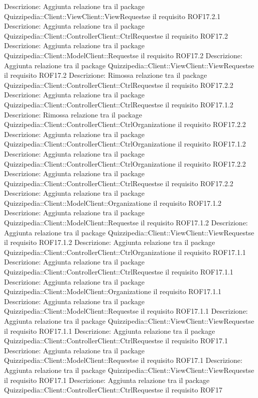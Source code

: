 Descrizione: Aggiunta relazione tra il package Quizzipedia::Client::ViewClient::ViewRequestse il requisito ROF17.2.1 
Descrizione: Aggiunta relazione tra il package Quizzipedia::Client::ControllerClient::CtrlRequestse il requisito ROF17.2 
Descrizione: Aggiunta relazione tra il package Quizzipedia::Client::ModelClient::Requestse il requisito ROF17.2 
Descrizione: Aggiunta relazione tra il package Quizzipedia::Client::ViewClient::ViewRequestse il requisito ROF17.2 
Descrizione: Rimossa relazione tra il package Quizzipedia::Client::ControllerClient::CtrlRequestse il requisito ROF17.2.2 
Descrizione: Aggiunta relazione tra il package Quizzipedia::Client::ControllerClient::CtrlRequestse il requisito ROF17.1.2 
Descrizione: Rimossa relazione tra il package Quizzipedia::Client::ControllerClient::CtrlOrganizatione il requisito ROF17.2.2 
Descrizione: Aggiunta relazione tra il package Quizzipedia::Client::ControllerClient::CtrlOrganizatione il requisito ROF17.1.2 
Descrizione: Aggiunta relazione tra il package Quizzipedia::Client::ControllerClient::CtrlOrganizatione il requisito ROF17.2.2 
Descrizione: Aggiunta relazione tra il package Quizzipedia::Client::ControllerClient::CtrlRequestse il requisito ROF17.2.2 
Descrizione: Aggiunta relazione tra il package Quizzipedia::Client::ModelClient::Organizatione il requisito ROF17.1.2 
Descrizione: Aggiunta relazione tra il package Quizzipedia::Client::ModelClient::Requestse il requisito ROF17.1.2 
Descrizione: Aggiunta relazione tra il package Quizzipedia::Client::ViewClient::ViewRequestse il requisito ROF17.1.2 
Descrizione: Aggiunta relazione tra il package Quizzipedia::Client::ControllerClient::CtrlOrganizatione il requisito ROF17.1.1 
Descrizione: Aggiunta relazione tra il package Quizzipedia::Client::ControllerClient::CtrlRequestse il requisito ROF17.1.1 
Descrizione: Aggiunta relazione tra il package Quizzipedia::Client::ModelClient::Organizatione il requisito ROF17.1.1 
Descrizione: Aggiunta relazione tra il package Quizzipedia::Client::ModelClient::Requestse il requisito ROF17.1.1 
Descrizione: Aggiunta relazione tra il package Quizzipedia::Client::ViewClient::ViewRequestse il requisito ROF17.1.1 
Descrizione: Aggiunta relazione tra il package Quizzipedia::Client::ControllerClient::CtrlRequestse il requisito ROF17.1 
Descrizione: Aggiunta relazione tra il package Quizzipedia::Client::ModelClient::Requestse il requisito ROF17.1 
Descrizione: Aggiunta relazione tra il package Quizzipedia::Client::ViewClient::ViewRequestse il requisito ROF17.1 
Descrizione: Aggiunta relazione tra il package Quizzipedia::Client::ControllerClient::CtrlRequestse il requisito ROF17 
